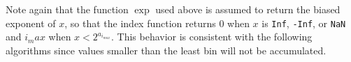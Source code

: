     Note again that the function $\exp$ used above is assumed to return the biased exponent of $x$, so that the index function returns 0 when $x$ is \texttt{Inf}, \texttt{-Inf}, or \texttt{NaN} and $i_max$ when $x < 2^{a_{i_{max}}}$.
    This behavior is consistent with the following algorithms since values smaller than the least bin will not be accumulated.
